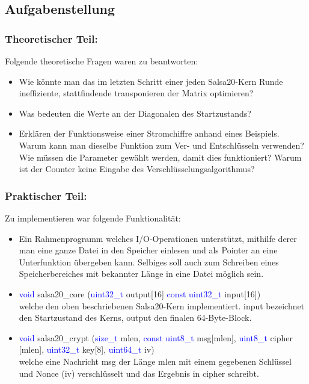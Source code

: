 \documentclass[course=erap]{aspdoc}
\begin{document}
\subsection{Aufgabenstellung}

\subsubsection{Theoretischer Teil:}
Folgende theoretische Fragen waren zu beantworten:
\begin{itemize}
    \item Wie könnte man das im letzten Schritt einer jeden Salsa20-Kern Runde ineffiziente, stattfindende transponieren der Matrix optimieren?
    \item Was bedeuten die Werte an der Diagonalen des Startzustands?
    \item Erklären der Funktionsweise einer Stromchiffre anhand eines Beispiels. Warum kann man dieselbe Funktion zum Ver- und Entschlüsseln verwenden? Wie müssen die Parameter gewählt werden, damit dies funktioniert? Warum ist der Counter keine Eingabe des Verschlüsselungsalgorithmus?
\end{itemize}

\subsubsection{Praktischer Teil:}
Zu implementieren  war folgende Funktionalität: 
\begin{itemize}
    \item Ein Rahmenprogramm welches I/O-Operationen unterstützt, mithilfe derer man eine ganze Datei in den Speicher einlesen und als Pointer an eine Unterfunktion übergeben kann. Selbiges soll auch zum Schreiben eines Speicherbereiches mit bekannter Länge in eine Datei möglich sein.
    \item \textcolor{blue}{void} salsa20\_core (\textcolor{blue} {uint32\_t} output[16] \textcolor{blue}{const uint32\_t} input[16]) \\
    welche den oben beschriebenen Salsa20-Kern implementiert. input bezeichnet den Startzustand des Kerns, output den finalen 64-Byte-Block. \\
    \item \textcolor{blue} {void} salsa20\_crypt (\textcolor{blue}{size\_t} mlen, \textcolor{blue} {const uint8\_t} msg[mlen], \textcolor{blue}{uint8\_t} cipher [mlen], \textcolor{blue}{uint32\_t} key[8], \textcolor{blue} {uint64\_t} iv) \\
    welche eine Nachricht msg der Länge mlen mit einem gegebenen Schlüssel und Nonce (iv) verschlüsselt und das Ergebnis in cipher schreibt.
\end{itemize}
\end{document}
